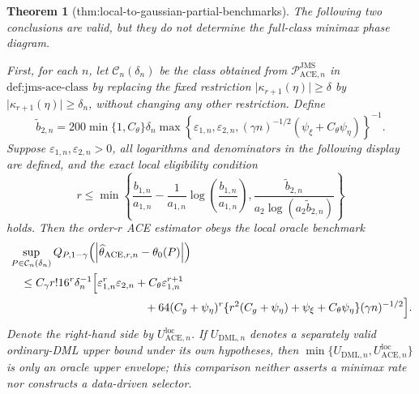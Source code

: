 \documentclass{article}
\newtheorem{theorem}{Theorem}
\begin{document}
\begin{theorem}[thm:local-to-gaussian-partial-benchmarks]\label{thm:local-to-gaussian-partial-benchmarks}
The following two conclusions are valid, but they do not determine the full-class minimax phase diagram.

First, for each \(n\), let \(\mathcal C_n(\delta_n)\) be the class obtained from \(\mathcal P_{\mathrm{ACE},n}^{\mathrm{JMS}}\) in \(\text{def:jms-ace-class}\) by replacing the fixed restriction \(\lvert\kappa_{r+1}(\eta)\rvert\ge\delta\) by \(\lvert\kappa_{r+1}(\eta)\rvert\ge\delta_n\), without changing any other restriction.  Define
\[
 \widetilde b_{2,n}
 =200\min\{1,C_{\theta}\}\delta_n
 \max\!\left\{
   \varepsilon_{1,n},\varepsilon_{2,n},
   (\gamma n)^{-1/2}(\psi_{\xi}+C_{\theta}\psi_{\eta})
 \right\}^{-1}.
\]
Suppose \(\varepsilon_{1,n},\varepsilon_{2,n}>0\), all logarithms and denominators in the following display are defined, and the exact local eligibility condition
\[
 r\le
 \min\!\left\{
   \frac{b_{1,n}}{a_{1,n}}
   -\frac{1}{a_{1,n}}\log\!\left(\frac{b_{1,n}}{a_{1,n}}\right),
   \frac{\widetilde b_{2,n}}{a_2\log(a_2\widetilde b_{2,n})}
 \right\}
\]
holds.  Then the order-\(r\) ACE estimator obeys the local oracle benchmark
\[
\begin{aligned}
 &\sup_{P\in\mathcal C_n(\delta_n)}
 Q_{P,1-\gamma}
 \!\left(\left|\widehat\theta_{\mathrm{ACE},r,n}-\theta_0(P)\right|\right)\\
 &\quad\le
 C_{\gamma}r!16^r\delta_n^{-1}
 \Bigl[
   \varepsilon_{1,n}^r\varepsilon_{2,n}
   +C_{\theta}\varepsilon_{1,n}^{r+1}\\
 &\hspace{42mm}
   +64(C_g+\psi_{\eta})^r
    \{r^2(C_g+\psi_{\eta})+\psi_{\xi}+C_{\theta}\psi_{\eta}\}
    (\gamma n)^{-1/2}
 \Bigr].
\end{aligned}
\]
Denote the right-hand side by \(U_{\mathrm{ACE},n}^{\mathrm{loc}}\).  If \(U_{\mathrm{DML},n}\) denotes a separately valid ordinary-DML upper bound under its own hypotheses, then \(\min\{U_{\mathrm{DML},n},U_{\mathrm{ACE},n}^{\mathrm{loc}}\}\) is only an oracle upper envelope; this comparison neither asserts a minimax rate nor constructs a data-driven selector.


\end{theorem}
\end{document}
